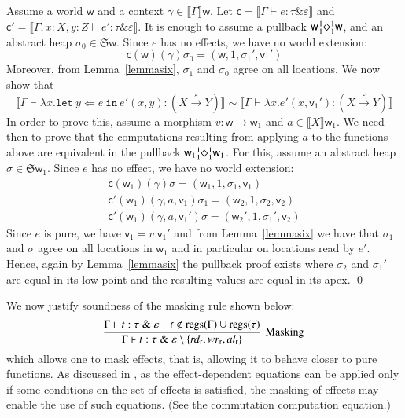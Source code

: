 \documentclass[orivec]{llncs}
\renewcommand{\paragraph}[1]{\noindent {\bf #1}}
\newcommand{\keywd}[1]{\mathtt{#1}}
\newcommand{\sq}[4]{\tensor*[^{#1}_{#2}]{\Diamond}{^{#3}_{#4}}}
\newcommand{\effto}[1]{\stackrel{#1}{\to}}
\newcommand{\letin}[2]{\keywd{let}\:{#1}\!\Leftarrow\!{#2}\:\keywd{in}\:}
\newcommand{\eff}{\varepsilon}
\newcommand{\regs}[1]{\mathrm{regs}({#1})}
\newcommand{\regid}{\ensuremath{\mathsf{r}}}
\newcommand{\sem}[1]{\ensuremath{\llbracket {#1} \rrbracket}}
\newcommand{\aEff}[1]{\ensuremath{\mathit{al}_{#1}}}
\newcommand{\rEff}[1]{\ensuremath{\mathit{rd}_{#1}}}
\newcommand{\wEff}[1]{\ensuremath{\mathit{wr}_{#1}}}
\renewenvironment{proof}{\vspace{-1mm} \noindent {\bf Proof}\quad}{\qed}
\newcommand\w{\ensuremath{\mathsf{w}}\xspace}
\newcommand{\Astores}{\mathfrak{S}}
\newcommand\val{\ensuremath{\mathsf{v}}\xspace}
\newcommand\cval{\ensuremath{\mathsf{c}}\xspace}
\newcommand{\ety}[2]{{#1}\mathrel{\&}{#2}}
\newcommand{\valty}[1]{#1}
\begin{document}
\begin{proof}
Assume a world \w and a context $\gamma \in \sem{\Gamma}\w$.
Let $\cval = \sem{\Gamma \vdash e : \ety{\tau}{\eff}}$ and 
$\cval' = \sem{\Gamma, x: X, y: Z \vdash e' : \ety{\tau}{\eff}}$. 
It is enough to assume a pullback 
$\w \sq{1}{1}{1}{1} \w$, and an abstract heap $\sigma_0 \in
\Astores \w$. Since $e$ has no effects, we have no world extension:
\[
 \cval(\w)(\gamma)\sigma_0  =  (\w, 1, \sigma_1', \val_1') 
\]
Moreover, from Lemma~\ref{lemmasix}, $\sigma_1$ and $\sigma_0$ agree on
all locations. We now show that 
\[
\sem{\Gamma\vdash  \lambda x.\letin{y}{e} {e'(x,y)} : (\valty{X\effto\eff
Y})}
\sim
\sem{\Gamma\vdash \lambda x.e'(x,\val_1') : (\valty{X\effto\eff
Y})}
\]
In order to prove this, assume a morphism $v : \w \to \w_1$ and $a \in
\sem{X}\w_1$. We need then to prove that the computations resulting from 
applying $a$ to the functions above are equivalent in the pullback
$\w_1\sq{1}{1}{1}{1}\w_1$. For this, assume an abstract heap $\sigma \in
\Astores \w_1$. Since $e$ has no effect, we have no world extension:
\[
\begin{array}{l}
 \cval(\w_1)(\gamma)\sigma  =  (\w_1, 1, \sigma_1, \val_1) \\
 \cval'(\w_1)(\gamma, a, \val_1 )\sigma_1  =  (\w_2, 1, \sigma_2, \val_2)\\
\cval'(\w_1)(\gamma, a, \val_1' )\sigma  =  (\w_2', 1, \sigma_1', \val_2)
\end{array}
\]
Since $e$ is pure, we have $\val_1 = v.\val_1'$ and from
Lemma~\ref{lemmasix} we have that $\sigma_1$ and $\sigma$ agree on all
locations in $\w_1$ and in particular on locations read by $e'$. Hence, 
again by Lemma~\ref{lemmasix} the pullback proof exists where $\sigma_2$
and 
$\sigma_1'$ are equal in its low point and the resulting values are equal
in its apex.
\end{proof}

\paragraph{Masking}
We now justify soundness of the masking rule shown below:
\[
 \infer[\textrm{Masking}]{\Gamma \vdash t :
\ety{\tau}{\eff\setminus\{\rEff{\regid},\wEff{\regid}, \aEff{\regid}\}}}
{\Gamma \vdash t : \ety{\tau}{\eff} 
\quad \regid \notin \regs{\Gamma} \cup \regs{\tau}}
\]
which allows one to mask effects, that is, allowing it to behave closer to
pure functions. As discussed in \cite{DBLP:conf/ppdp/BentonKBH07}, as the
effect-dependent equations can be applied only if some conditions on the
set of effects is satisfied, the masking of effects may enable the use of
such equations. (See the commutation computation equation.)
\end{document}
